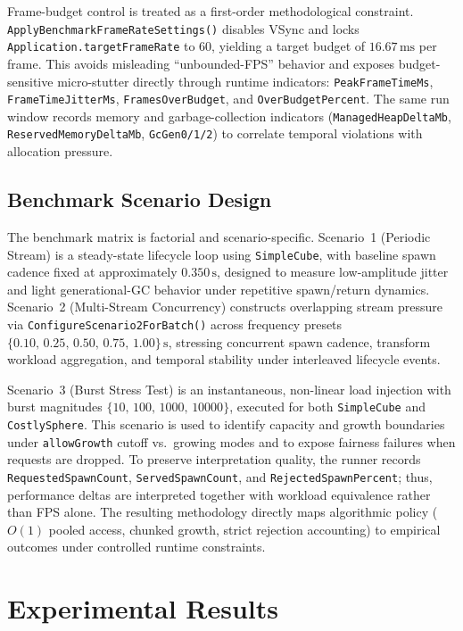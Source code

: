 \documentclass[11pt]{article}
\begin{document}
Frame-budget control is treated as a first-order methodological constraint. \texttt{ApplyBenchmarkFrameRateSettings()} disables VSync and locks \texttt{Application.targetFrameRate} to \(60\), yielding a target budget of \(16.67\,\mathrm{ms}\) per frame. This avoids misleading ``unbounded-FPS'' behavior and exposes budget-sensitive micro-stutter directly through runtime indicators: \texttt{PeakFrameTimeMs}, \texttt{FrameTimeJitterMs}, \texttt{FramesOverBudget}, and \texttt{OverBudgetPercent}. The same run window records memory and garbage-collection indicators (\texttt{ManagedHeapDeltaMb}, \texttt{ReservedMemoryDeltaMb}, \texttt{GcGen0/1/2}) to correlate temporal violations with allocation pressure.

\subsection{Benchmark Scenario Design}

The benchmark matrix is factorial and scenario-specific. Scenario~1 (Periodic Stream) is a steady-state lifecycle loop using \texttt{SimpleCube}, with baseline spawn cadence fixed at approximately \(0.350\,\mathrm{s}\), designed to measure low-amplitude jitter and light generational-GC behavior under repetitive spawn/return dynamics. Scenario~2 (Multi-Stream Concurrency) constructs overlapping stream pressure via \texttt{ConfigureScenario2ForBatch()} across frequency presets \(\{0.10,\,0.25,\,0.50,\,0.75,\,1.00\}\,\mathrm{s}\), stressing concurrent spawn cadence, transform workload aggregation, and temporal stability under interleaved lifecycle events.

Scenario~3 (Burst Stress Test) is an instantaneous, non-linear load injection with burst magnitudes \(\{10,\,100,\,1000,\,10000\}\), executed for both \texttt{SimpleCube} and \texttt{CostlySphere}. This scenario is used to identify capacity and growth boundaries under \texttt{allowGrowth} cutoff vs.\ growing modes and to expose fairness failures when requests are dropped. To preserve interpretation quality, the runner records \texttt{RequestedSpawnCount}, \texttt{ServedSpawnCount}, and \texttt{RejectedSpawnPercent}; thus, performance deltas are interpreted together with workload equivalence rather than FPS alone. The resulting methodology directly maps algorithmic policy (\(O(1)\) pooled access, chunked growth, strict rejection accounting) to empirical outcomes under controlled runtime constraints.

\section{Experimental Results}
\end{document}
